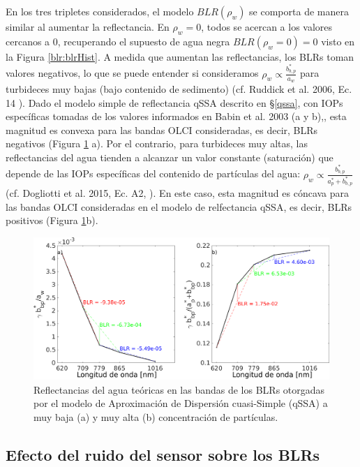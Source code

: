         En los tres tripletes considerados, el modelo $BLR(\rho_{w})$ se comporta de manera similar al aumentar la reflectancia. En $\rho_{w}=0$, todos se acercan a los valores cercanos a 0, recuperando el supuesto de agua negra $BLR(\rho_{w}=0)=0$ visto en la Figura \ref{blr:blrHist}. A medida que aumentan las reflectancias, los BLRs toman valores negativos, lo que se puede entender si consideramos $\rho_{w} \propto \frac{b_{b,p}^{*}}{a_{w}}$ para turbideces muy bajas (bajo contenido de sedimento) (cf. Ruddick et al. 2006, Ec. 14 \cite{ruddick2006}). Dado el modelo simple de reflectancia qSSA descrito en \S \ref{qssa}, con IOPs específicas tomadas de los valores informados en Babin et al. 2003 (a y b),\cite{babin2003a}\cite{babin2003b}, esta magnitud es convexa para las bandas OLCI consideradas, es decir, BLRs negativos (Figura \ref{blr:blrBehaviorLimits} a).
        Por el contrario, para turbideces muy altas, las reflectancias del agua tienden a alcanzar un valor constante (saturación) que depende de las IOPs específicas del contenido de partículas del agua: $\rho_{w} \propto \frac{b_{b,p}^{*}}{a_{p}^{*}+b_{b,p}^{*}}$ (cf. Dogliotti et al. 2015, Ec. A2, \cite{dogliotti2015}). En este caso, esta magnitud es cóncava para las bandas OLCI consideradas en el modelo de relfectancia qSSA, es decir, BLRs positivos (Figura \ref{blr:blrBehaviorLimits}b).
        
        \begin{figure}
        \centering
        \includegraphics[width=\textwidth]{blr/figures/blrBehaviorLimits}
        \caption{Reflectancias del agua teóricas en las bandas de los BLRs otorgadas por el modelo de Aproximación de Dispersión cuasi-Simple (qSSA) a muy baja (a) y muy alta (b) concentración de partículas.}
        \label{blr:blrBehaviorLimits}
        \end{figure}

    \subsection{Efecto del ruido del sensor sobre los BLRs}
    \label{blr:s:results:blrNoise}    
        
